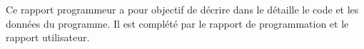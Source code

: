 \documentclass{themeensg}
\begin{document}
Ce rapport programmeur a pour objectif de décrire dans le détaille le code et les données du programme. Il est complété par le rapport de programmation et le rapport utilisateur.\\







\newpage
\listoffigures

\end{document}
